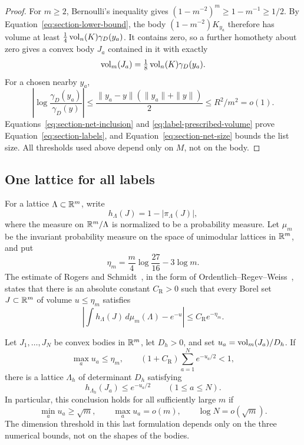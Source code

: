 \begin{proof}
For $m\ge2$, Bernoulli's inequality gives
$(1-m^{-2})^m\ge1-m^{-1}\ge1/2$.
By Equation~\eqref{eq:section-lower-bound}, the body
$(1-m^{-2})K_{y_a}$ therefore has volume at least
$\tfrac14\operatorname{vol}_n(K)\gamma_D(y_a)$.
It contains zero, so a further homothety about zero gives a convex body
$J_a$ contained in it with exactly
\begin{equation}
 \operatorname{vol}_m(J_a)=\tfrac18\operatorname{vol}_n(K)\gamma_D(y_a).
 \label{eq:label-prescribed-volume}
\end{equation}
For a chosen nearby $y_a$,
\[
 \left|\log\frac{\gamma_D(y_a)}{\gamma_D(y)}\right|
 \le \frac{\|y_a-y\|(\|y_a\|+\|y\|)}2
 \le R^2/m^2=o(1).
\]
Equations~\eqref{eq:section-net-inclusion} and
\eqref{eq:label-prescribed-volume} prove Equation~\eqref{eq:section-labels},
and Equation~\eqref{eq:section-net-size} bounds the list size.
All thresholds used above depend only on $M$, not on the body.
\end{proof}

\subsection{One lattice for all labels}

For a lattice $\Lambda\subset\mathbb R^m$, write
\[
 h_{\Lambda}(J)
 =1-|\pi_\Lambda(J)|,
\]
where the measure on $\mathbb R^m/\Lambda$ is normalized to be a probability
measure.  Let $\mu_m$ be the invariant probability measure on the space
of unimodular lattices in $\mathbb R^m$, and put
\[
 \eta_m=\frac m4\log\frac{27}{16}-3\log m.
\]
The estimate of Rogers and Schmidt~\cite{Rog58,Sch58}, in the form of
Ordentlich--Regev--Weiss~\cite[Theorem~2.3]{ORW}, states that there is an
absolute constant $C_{\mathrm R}>0$ such that every Borel set
$J\subset\mathbb R^m$ of volume $u\le\eta_m$ satisfies
\begin{equation}
 \left|\int h_{\Lambda}(J)\,d\mu_m(\Lambda)-e^{-u}\right|
 \le C_{\mathrm R}e^{-\eta_m}.
 \label{eq:mean-hole-input}
\end{equation}

\begin{lemma}
\label{lem:horizontal}
Let $J_1,\ldots,J_N$ be convex bodies in $\mathbb R^m$, let $D_h>0$, and set
$u_a=\operatorname{vol}_m(J_a)/D_h$.  If
\begin{equation}
 \max_a u_a\le\eta_m,
 \qquad
 (1+C_{\mathrm R})\sum_{a=1}^N e^{-u_a/2}<1,
 \label{eq:horizontal-criterion}
\end{equation}
there is a lattice $\Lambda_h$ of determinant $D_h$ satisfying
\begin{equation}
 h_{\Lambda_h}(J_a)\le e^{-u_a/2}
 \qquad (1\le a\le N).
 \label{eq:horizontal-holes}
\end{equation}
In particular, this conclusion holds for all sufficiently large $m$ if
\[
 \min_a u_a\ge\sqrt m,\qquad
 \max_a u_a=o(m),\qquad
 \log N=o(\sqrt m).
\]
The dimension threshold in this last formulation depends only on the
three numerical bounds, not on the shapes of the bodies.
\end{lemma}

